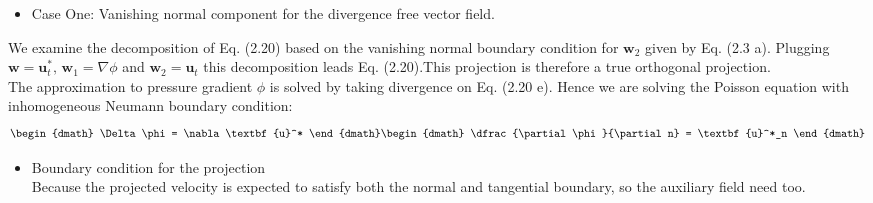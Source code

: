 \begin{itemize}
\item
Case One: Vanishing normal component for the divergence free vector field.
\end{itemize}
We examine the decomposition of Eq. (2.20) based on the vanishing normal boundary condition for $\textbf{w}_2$ given by Eq. (2.3 a). Plugging $\textbf{w} = \textbf{u}^*_t, \, \textbf{w}_1 = \nabla \phi$ and $\textbf{w}_2 = \textbf{u}_t$ this decomposition leads Eq. (2.20).This projection is therefore a true orthogonal  projection. \\
The approximation to pressure gradient $\phi$ is solved by taking divergence on Eq. (2.20 e). Hence we are solving the Poisson equation with inhomogeneous Neumann boundary condition:
\begin{dgroup}
\begin{dmath}
\Delta \phi = \nabla \textbf{u}^*
\end{dmath}
\begin{dmath}
\dfrac{\partial \phi}{\partial n} = \textbf{u}^*_n
\end{dmath}
\end{dgroup}

\begin{itemize}
\item Boundary condition for the projection\\
Because the projected velocity is expected to satisfy both the normal and tangential boundary, so the auxiliary field need too.
\end{itemize}

